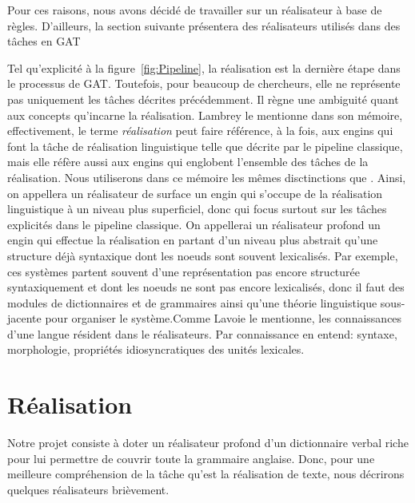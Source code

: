 Pour ces raisons, nous avons décidé de travailler sur un réalisateur à base de règles. D'ailleurs, la section suivante présentera des réalisateurs utilisés dans des tâches en \ac{GAT}

Tel qu'explicité à la figure~\ref{fig:Pipeline}, la réalisation est la dernière étape dans le processus de \ac{GAT}. Toutefois, pour beaucoup de chercheurs, elle ne représente pas uniquement les tâches décrites précédemment. Il règne une ambiguité quant aux concepts qu'incarne la réalisation. Lambrey le mentionne \citep{LambreyImplementationcollocationspour2017} dans son mémoire, effectivement, le terme \emph{réalisation} peut faire référence, à la fois, aux engins qui font la tâche de réalisation linguistique telle que décrite par le pipeline classique, mais elle réfère aussi aux engins qui englobent l'ensemble des tâches de la réalisation. Nous utiliserons dans ce mémoire les mêmes disctinctions que \citep{LambreyImplementationcollocationspour2017}. Ainsi, on appellera un réalisateur de surface un engin qui s'occupe de la réalisation linguistique à un niveau plus superficiel, donc qui focus surtout sur les tâches explicités dans le pipeline classique. On appellerai un réalisateur profond un engin qui effectue la réalisation en partant d'un niveau plus abstrait qu'une structure déjà syntaxique dont les noeuds sont souvent lexicalisés. Par exemple, ces systèmes partent souvent d'une représentation pas encore structurée syntaxiquement et dont les noeuds ne sont pas encore lexicalisés, donc il faut des modules de dictionnaires et de grammaires ainsi qu'une théorie linguistique sous-jacente pour organiser le système.Comme Lavoie le mentionne\citep{LavoieFastPortableRealizer1997}, les connaissances d'une langue résident dans le réalisateurs. Par connaissance en entend: syntaxe, morphologie, propriétés idiosyncratiques des unités lexicales. 



\section{Réalisation}

Notre projet consiste à doter un réalisateur profond d'un dictionnaire verbal riche pour lui permettre de couvrir toute la grammaire anglaise. Donc, pour une meilleure compréhension de la tâche qu'est la réalisation de texte, nous décrirons quelques réalisateurs brièvement.

